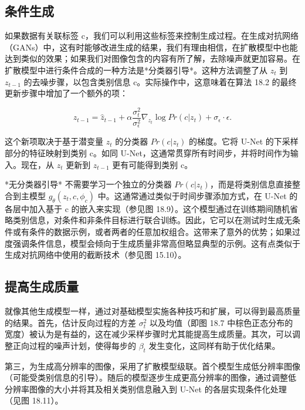 \documentclass[lang=cn,newtx,10pt,scheme=chinese]{elegantbook}
\begin{document}
\subsection{条件生成}
如果数据有关联标签 c，我们可以利用这些标签来控制生成过程。在生成对抗网络（GANs）中，这有时能够改进生成的结果，我们有理由相信，在扩散模型中也能达到类似的效果；如果我们对图像包含的内容有所了解，去除噪声就更加容易。在扩散模型中进行条件合成的一种方法是*分类器引导*。这种方法调整了从 \(z_t\) 到 \(z_{t-1}\) 的去噪步骤，以包含类别信息 c。实际操作中，这意味着在算法 18.2 的最终更新步骤中增加了一个额外的项：

\begin{equation}
z_{t-1} = \hat{z}_{t-1} + \alpha \frac{\sigma^2_t}{\sigma^2_{\epsilon}} \nabla_{z_t} \log Pr(c|z_t) + \sigma_{\epsilon} \cdot \epsilon. 
\end{equation}

这个新项取决于基于潜变量 \(z_t\) 的分类器 \(Pr(c|z_t)\) 的梯度。它将 U-Net 的下采样部分的特征映射到类别 c。如同 U-Net，这通常贯穿所有时间步，并将时间作为输入。现在，从 \(z_t\) 更新到 \(z_{t-1}\) 更有可能得到类别 c。

*无分类器引导* 不需要学习一个独立的分类器 \(Pr(c|z_t)\)，而是将类别信息直接整合到主模型 \(g_{\theta}(z_t, c, \phi_c)\) 中。这通常通过类似于时间步骤添加方式，在 U-Net 的各层中加入基于 c 的嵌入来实现（参见图 18.9）。这个模型通过在训练期间随机省略类别信息，对条件和非条件目标进行联合训练。因此，它可以在测试时生成无条件或有条件的数据示例，或者两者的任意加权组合。这带来了意外的优势；如果过度强调条件信息，模型会倾向于生成质量非常高但略显典型的示例。这有点类似于生成对抗网络中使用的截断技术（参见图 15.10）。

\subsection{提高生成质量}
就像其他生成模型一样，通过对基础模型实施各种技巧和扩展，可以得到最高质量的结果。首先，估计反向过程的方差 \(\sigma_t^2\) 以及均值（即图 18.7 中棕色正态分布的宽度）被认为是有益的，这在减少采样步骤时尤其能提高生成质量。其次，可以调整正向过程的噪声计划，使得每步的 \(\beta_t\) 发生变化，这同样有助于优化结果。

第三，为生成高分辨率的图像，采用了扩散模型级联。首个模型生成低分辨率图像（可能受类别信息的引导）。随后的模型逐步生成更高分辨率的图像，通过调整低分辨率图像的大小并将其及相关类别信息融入到 U-Net 的各层实现条件化处理（见图 18.11）。
\end{document}
